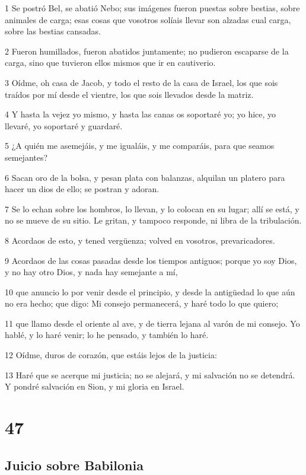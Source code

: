 \par 1 Se postró Bel, se abatió Nebo; sus imágenes fueron puestas sobre bestias, sobre animales de carga; esas cosas que vosotros solíais llevar son alzadas cual carga, sobre las bestias cansadas.
\par 2 Fueron humillados, fueron abatidos juntamente; no pudieron escaparse de la carga, sino que tuvieron ellos mismos que ir en cautiverio.
\par 3 Oídme, oh casa de Jacob, y todo el resto de la casa de Israel, los que sois traídos por mí desde el vientre, los que sois llevados desde la matriz.
\par 4 Y hasta la vejez yo mismo, y hasta las canas os soportaré yo; yo hice, yo llevaré, yo soportaré y guardaré.
\par 5 ¿A quién me asemejáis, y me igualáis, y me comparáis, para que seamos semejantes?
\par 6 Sacan oro de la bolsa, y pesan plata con balanzas, alquilan un platero para hacer un dios de ello; se postran y adoran.
\par 7 Se lo echan sobre los hombros, lo llevan, y lo colocan en su lugar; allí se está, y no se mueve de su sitio. Le gritan, y tampoco responde, ni libra de la tribulación.
\par 8 Acordaos de esto, y tened vergüenza; volved en vosotros, prevaricadores.
\par 9 Acordaos de las cosas pasadas desde los tiempos antiguos; porque yo soy Dios, y no hay otro Dios, y nada hay semejante a mí,
\par 10 que anuncio lo por venir desde el principio, y desde la antigüedad lo que aún no era hecho; que digo: Mi consejo permanecerá, y haré todo lo que quiero;
\par 11 que llamo desde el oriente al ave, y de tierra lejana al varón de mi consejo. Yo hablé, y lo haré venir; lo he pensado, y también lo haré.
\par 12 Oídme, duros de corazón, que estáis lejos de la justicia:
\par 13 Haré que se acerque mi justicia; no se alejará, y mi salvación no se detendrá. Y pondré salvación en Sion, y mi gloria en Israel.

\chapter{47}

\section*{Juicio sobre Babilonia}


